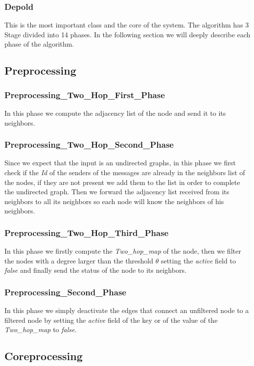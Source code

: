 \documentclass[12pt]{article}
\begin{document}
\subsubsection{Depold}
This is the most important class and the core of the system. The algorithm has 3 Stage divided into 14 phases. In the following section we will deeply describe each phase of the algorithm.
\subsection{Preprocessing}
\subsubsection{Preprocessing\_Two\_Hop\_First\_Phase}
In this phase we compute the adjacency list of the node and send it to its neighbors.
\subsubsection{Preprocessing\_Two\_Hop\_Second\_Phase}
Since we expect that the input is an undirected graphs, in this phase we first check if the \emph{Id} of the senders of the messages are already in the neighbors list of the nodes, if they are not present we add them to the list in order to complete the undirected graph.
Then we forward the adjacency list received from its neighbors to all its neighbors so each node will know the neighbors of his neighbors.
\subsubsection{Preprocessing\_Two\_Hop\_Third\_Phase}
In this phase we firstly compute the \emph{Two\_hop\_map} of the node, then we filter the nodes with a degree larger than the threshold $\theta$ setting the \emph{active} field to \emph{false} and finally send the status of the node to its neighbors.
\subsubsection{Preprocessing\_Second\_Phase}
In this phase we simply deactivate the edges that connect an unfiltered node to a filtered node by setting the \emph{active} field of the key or of the value of the \emph{Two\_hop\_map} to \emph{false}.
\subsection{Coreprocessing}
\end{document}
